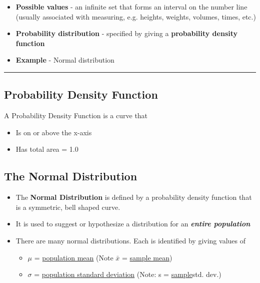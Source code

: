 \documentclass{report}
\begin{document}
\begin{itemize}[label=$\bullet$]
\begin{itemize}[label=$\circ$]
        \item \textbf{Possible values} - an infinite set that forms an interval on the number line \\ (usually associated with measuring, e.g. heights, weights, volumes, times, etc.)
          \bigbreak \noindent
        \item \textbf{Probability distribution} - specified by giving a \textbf{probability density function}
          \bigbreak \noindent
        \item \textbf{Example} - Normal distribution
      \end{itemize}
  \end{itemize}
  \bigbreak \noindent \bigbreak \noindent
  \hrule
  \subsection*{Probability Density Function}
  \bigbreak \noindent
  \begin{minipage}{0.45\textwidth}
    \vspace{-10mm}A Probability Density Function is a curve that 
  \begin{itemize}
    \item Is on or above the x-axis
    \item Has total area = 1.0
  \end{itemize}
  \end{minipage}
  \hspace{2em}\begin{minipage}{0.4\textwidth}
  \end{minipage}

\bigbreak \noindent
\pagebreak
\subsection*{The Normal Distribution}
\begin{itemize}
  \item The \textbf{Normal Distribution} is defined by a probability density function that is a symmetric, bell shaped curve.
    \bigbreak \noindent
  \item It is used to suggest or hypothesize a distribution for an \textbf{\textit{entire population}}
    \bigbreak \noindent
  \item There are many normal distributions. Each is identified by giving values of
    \bigbreak \noindent
    \begin{itemize}[label=$\circ$]
      \item $\mu$ = \underline{population mean}  \hspace{11em} (Note $\bar{x}$ = \underline{sample mean}) 
      \bigbreak \noindent
    \item $\sigma$ = \underline{population standard deviation} \hspace{5em} (Note: s = \underline{sample}std. dev.)
    \end{itemize}
\end{itemize}
\bigbreak \noindent \bigbreak \noindent
\q 
\end{document}
